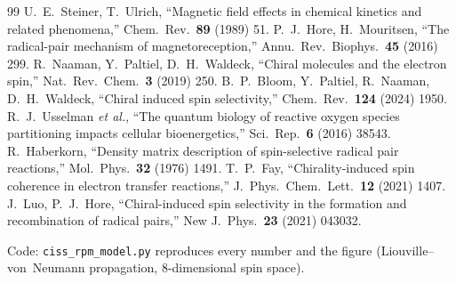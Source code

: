 \documentclass[11pt,a4paper]{article}
\begin{document}
\begin{thebibliography}{99}\small
{} U.~E.~Steiner, T.~Ulrich, ``Magnetic field effects in
  chemical kinetics and related phenomena,'' Chem.\ Rev.\ \textbf{89}
  (1989) 51.
 P.~J.~Hore, H.~Mouritsen, ``The radical-pair mechanism of
  magnetoreception,'' Annu.\ Rev.\ Biophys.\ \textbf{45} (2016) 299.
 R.~Naaman, Y.~Paltiel, D.~H.~Waldeck, ``Chiral molecules
  and the electron spin,'' Nat.\ Rev.\ Chem.\ \textbf{3} (2019) 250.
 B.~P.~Bloom, Y.~Paltiel, R.~Naaman, D.~H.~Waldeck,
  ``Chiral induced spin selectivity,'' Chem.\ Rev.\ \textbf{124} (2024)
  1950.
 R.~J.~Usselman \emph{et al.}, ``The quantum biology of
  reactive oxygen species partitioning impacts cellular bioenergetics,''
  Sci.\ Rep.\ \textbf{6} (2016) 38543.
 R.~Haberkorn, ``Density matrix description of
  spin-selective radical pair reactions,'' Mol.\ Phys.\ \textbf{32}
  (1976) 1491.
 T.~P.~Fay, ``Chirality-induced spin coherence in electron
  transfer reactions,'' J.\ Phys.\ Chem.\ Lett.\ \textbf{12} (2021) 1407.
 J.~Luo, P.~J.~Hore, ``Chiral-induced spin selectivity in
  the formation and recombination of radical pairs,'' New J.\ Phys.\
  \textbf{23} (2021) 043032.
\end{thebibliography}

\vspace{4pt}
\noindent\footnotesize Code: \texttt{ciss\_rpm\_model.py} reproduces every
number and the figure (Liouville--von~Neumann propagation, 8-dimensional
spin space).
\end{document}
